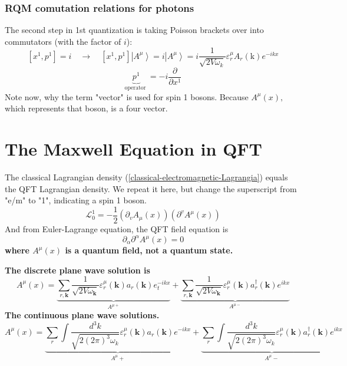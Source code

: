 \subsubsection{RQM comutation relations for photons}
The second step in 1st quantization is taking Poisson brackets over into commutators (with the
factor of $i$):
$$
\left[x^{1}, p^{1}\right]=i \quad \rightarrow \quad\left[x^{1}, p^{1}\right]\left|A^{\mu}\right\rangle= i\left|A^{\mu}\right\rangle= i \frac{1}{\sqrt{2 V \omega_{k}}} \varepsilon_{r}^{\mu} A_{r}(\mathrm{k}) e^{-i k x}
$$
$$
\underbrace{p^{1}}_{\text {operator }}=-i \frac{\partial}{\partial x^{1}}
$$
 Note now, why the term "vector" is used for spin 1 bosons. Because $A^{\mu}(x),$ which represents that boson, is a four vector.
\section{The Maxwell Equation in QFT}
The classical Lagrangian density (\ref{classical-electromagnetic-Lagrangia}) equals the QFT Lagrangian density. We repeat it here, but change the superscript from "e/m" to "1", indicating a spin 1 boson.
\begin{equation}
\mathcal{L}_{0}^{1}=-\frac{1}{2}\left(\partial_{v} A_{\mu}(x)\right)\left(\partial^{v} A^{\mu}(x)\right)
\end{equation}
And from Euler-Lagrange equation, the QFT field equation is
\begin{equation}
\partial_{\alpha} \partial^{\alpha} A^{\mu}(x)=0
\end{equation}
\textbf{where $A^{\mu}(x)$ is a quantum field, not a quantum state.}
\begin{qt}
\textbf{The discrete plane wave solution is}
\begin{equation}
A^{\mu}(x)=\underbrace{\sum_{r, \mathbf{k}} \frac{1}{\sqrt{2 V \omega_{\mathbf{k}}}} \varepsilon_{r}^{\mu}(\mathbf{k}) a_{r}(\mathbf{k}) e_{t}^{-i k x}}_{A^{\mu+}}+\underbrace{\sum_{r, \mathbf{k}} \frac{1}{\sqrt{2 V \omega_{\mathbf{k}}}} \varepsilon_{r}^{\mu}(\mathbf{k}) a_{r}^{\dagger}(\mathbf{k}) e^{i k x}}_{A^{\mu-}}
\label{discrete-solution-boson}
\end{equation}
\textbf{The continuous plane wave solutions.}
\begin{equation}
A^{\mu}(x)=\underbrace{\sum_{r} \int \frac{d^{3} k}{\sqrt{2(2 \pi)^{3} \omega_{k}}} \varepsilon_{r}^{\mu}(\mathbf{k}) a_{r}(\mathbf{k}) e^{-i k x}}_{A^{\mu}+}+\underbrace{\sum_{r} \int \frac{d^{3} k}{\sqrt{2(2 \pi)^{3} \omega_{k}}} \varepsilon_{r}^{\mu}(\mathbf{k}) a_{r}^{\dagger}(\mathbf{k}) e^{i k x}}_{A^{\mu}-}
\end{equation}
\end{qt}
